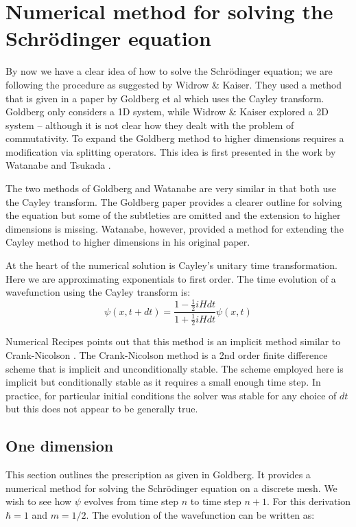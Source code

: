 \section{Numerical method for solving the Schr\"odinger equation}
By now we have a clear idea of how to solve the Schr\"odinger equation; we are following the procedure as suggested by Widrow \& Kaiser. They  used a method that is given in a paper by Goldberg et al \citep{bib_gold} which uses the Cayley transform. Goldberg only considers a 1D system, while Widrow \& Kaiser explored a 2D system -- although it is not clear how they dealt with the problem of commutativity. To expand the Goldberg method to higher dimensions requires a modification via splitting operators. This idea is first presented in the work by Watanabe and Tsukada \citep{bib_wat}.

The two methods of Goldberg and Watanabe are very similar in that both use the Cayley transform. The Goldberg paper provides a clearer outline for solving the equation but some of the subtleties are omitted and the extension to higher dimensions is missing. Watanabe, however, provided a method for extending the Cayley method to higher dimensions in his original paper. \citep{bib_wat}

At the heart of the numerical solution is Cayley's unitary time transformation. Here we are approximating exponentials to first order. The time evolution of a wavefunction using the Cayley transform is:
\begin{equation}
\label{cayley_eqn}
\psi(x, t+dt) = \frac{1- \frac{1}{2} i H dt}{1+ \frac{1}{2} i H dt} \psi(x, t)
\end{equation}

\noindent Numerical Recipes points out that this method is an implicit method similar to Crank-Nicolson \citep{bib_cn}. The Crank-Nicolson method is a 2nd order finite difference scheme that is implicit and unconditionally stable. The scheme employed here is implicit but conditionally stable as it requires a small enough time step. In practice, for particular initial conditions the solver was stable for any choice of $dt$ but this does not appear to be generally true.

\subsection{One dimension}
\label{onedim}
This section outlines the prescription as given in Goldberg. It provides a numerical method for solving the Schr\"odinger equation on a discrete mesh. We wish to see how $\psi$ evolves from time step $n$ to time step $n+1$. For this derivation $\hbar = 1$ and $m = 1/2$. The evolution of the wavefunction can be written as:

